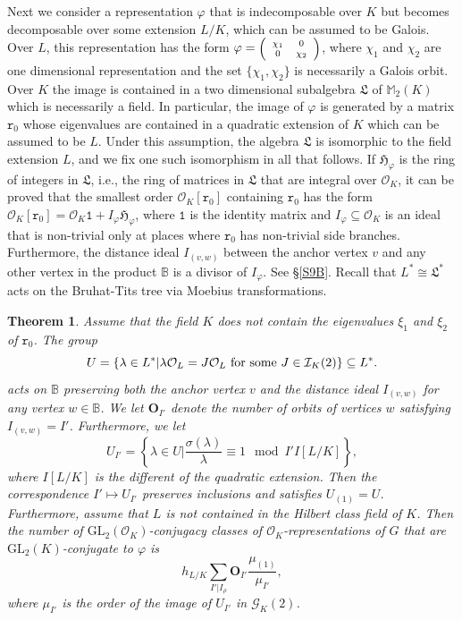 \documentclass{article}
\newtheorem{Thm}{Theorem}
\theoremstyle{definition}
\theoremstyle{remark}
\newcommand\sbmattrix[4]{\textnormal{\scriptsize$\left(\begin{array}{cc}#1&#2\\#3&#4\end{array}\right)$\normalsize}}
\begin{document}
Next we consider a representation $\varphi$ that is 
indecomposable over $K$ but becomes decomposable over some 
extension $L/K$, which can be assumed to be Galois. 
Over $L$, this representation has the form 
$\varphi=\sbmattrix{\chi_1}00{\chi_2}$, where $\chi_1$
and $\chi_2$ are one dimensional representation and 
the set $\{\chi_1,\chi_2\}$ is necessarily a Galois orbit.  
Over $K$ the image is contained in a two dimensional 
subalgebra $\mathfrak{L}$ of $\mathbb{M}_2(K)$ which
is necessarily a field. In particular, the image of $\varphi$
is generated by a matrix $\mathtt{r}_0$ whose eigenvalues are 
contained in a quadratic extension of $K$ which can be assumed 
to be $L$. Under this assumption, the algebra 
$\mathfrak{L}$ is isomorphic to the field extension
$L$, and we fix one such isomorphism in all that follows.
If $\mathfrak{H}_\varphi$ is the ring of integers
in $\mathfrak{L}$, i.e., the ring of matrices in
$\mathfrak{L}$ that are integral over $\mathcal{O}_K$,
it can be proved that the smallest order
$\mathcal{O}_K[\mathtt{r}_0]$ containing 
$\mathtt{r}_0$ has the form $\mathcal{O}_K[\mathtt{r}_0]=
\mathcal{O}_K\mathtt{1}+I_\varphi\mathfrak{H}_\varphi$,
where $\mathtt{1}$ is the identity matrix and
$I_\varphi\subseteq\mathcal{O}_K$ is an ideal that is
non-trivial only at places where $\mathtt{r}_0$ has
non-trivial side branches. Furthermore, the distance
ideal $I_{(v,w)}$ between the anchor vertex $v$
and any other vertex in the product $\mathbb{B}$
is a divisor of $I_\varphi$. See \S\ref{S9B}.
Recall that $L^*\cong\mathfrak{L}^*$ acts on the 
Bruhat-Tits tree via Moebius transformations. 

 \begin{Thm}\label{t6}
    Assume that the field $K$ does not contain
    the eigenvalues $\xi_1$ and $\xi_2$ of $\mathtt{r}_0$.
    The group $$U=\{\lambda\in 
    L^*|\lambda\mathcal{O}_L=J\mathcal{O}_L
    \textnormal{ for some }J\in\mathcal{I}_K(2)\}
    \subseteq L^*.$$  acts on $\mathbb{B}$ 
    preserving both the anchor vertex $v$ and the distance 
    ideal $I_{(v,w)}$ for any vertex $w\in\mathbb{B}$.  
    We let $\mathbf{O}_{I'}$ denote the 
    number of orbits of vertices $w$ satisfying
    $I_{(v,w)}=I'$. Furthermore, we let  $$U_{I'}=
    \left\{\lambda\in U\Big| \frac{\sigma(\lambda)}
    {\lambda}\equiv 1\mod I'I[L/K]\right\},$$
    where $I[L/K]$ is the different of the quadratic extension.
    Then the correspondence $I'\mapsto U_{I'}$ preserves
    inclusions and satisfies $U_{(1)}=U$. Furthermore,
    assume that $L$ is not contained in the Hilbert class field
    of $K$. Then the number of 
    $\mathrm{GL}_2(\mathcal{O}_K)$-conjugacy classes of 
    $\mathcal{O}_K$-representations of $G$ that are 
    $\mathrm{GL}_2(K)$-conjugate to $\varphi$ is 
    $$h_{L/K}\sum_{I'|I_\rho}\mathbf{O}_{I'}\frac{\mu_{(1)}}
    {\mu_{I'}},$$
    where $\mu_{I'}$ is the order of the image
    of $U_{I'}$ in $\mathcal{G}_K(2)$.
\end{Thm}
\end{document}
